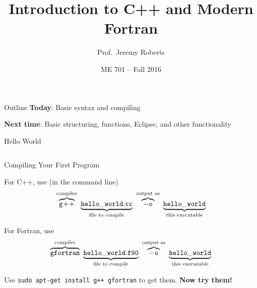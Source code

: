 \documentclass[10pt]{beamer}
\title %
[C++ and Fortran]{Introduction to C++ and Modern Fortran}
\author[Roberts]{Prof.~Jeremy Roberts}
\date
{ME 701 -- Fall 2016}
\begin{document}
\begin{frame}[plain]
  \titlepage
\end{frame}

\begin{frame}{Outline}
  \vfill 
  {\bf Today}: Basic syntax and compiling
  \vfill
  
  {\bf Next time}:  Basic structuring, functions, Eclipse, and other functionality

  \vfill
\end{frame}




\begin{frame}{Hello World}

\begin{columns}[c]
  \begin{column}{0.5\textwidth}
    
  \end{column}
  \begin{column}{0.5\textwidth}
    
  \end{column}
\end{columns}

\end{frame}

\begin{frame}{Compiling Your First Program}

For C++, use (in the command line)
\begin{equation*}
 \overbrace{\tt g\!+\!+}^{\text{compiler}}~
   \underbrace{\tt{hello\_world.cc}}_{\text{file to compile}}~
     \overbrace{\tt{-o}}^{\text{output as}}~
       \underbrace{\tt{hello\_world}}_{\text{this executable}} 
\end{equation*}
\vfill 

For Fortran, use
\begin{equation*}
 \overbrace{\tt gfortran}^{\text{compiler}}~
   \underbrace{\tt{hello\_world.f90}}_{\text{file to compile}}~
     \overbrace{\tt{-o}}^{\text{output as}}~
       \underbrace{\tt{hello\_world}}_{\text{this executable}} 
\end{equation*}

\vfill 
Use {\tt sudo apt-get install g++ gfortran} to get them.
{\bf Now try them!}

\end{frame}
\end{document}
